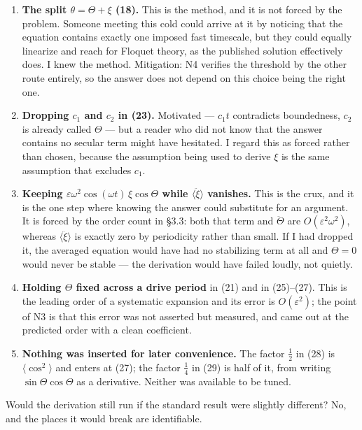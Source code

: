 \documentclass[11pt,a4paper]{article}
\providecommand{\tightlist}{\setlength{\itemsep}{0pt}\setlength{\parskip}{0pt}}
\begin{document}
\begin{enumerate}
\def\labelenumi{\arabic{enumi}.}
\tightlist
\item
  \textbf{The split \(\theta=\Theta+\xi\) (18).} This is the method, and it is not
  forced by the problem. Someone meeting this cold could arrive at it by
  noticing that the equation contains exactly one imposed fast timescale, but
  they could equally linearize and reach for Floquet theory, as the published
  solution effectively does. I knew the method. Mitigation: N4 verifies the
  threshold by the other route entirely, so the answer does not depend on this
  choice being the right one.
\item
  \textbf{Dropping \(c_1\) and \(c_2\) in (23).} Motivated --- \(c_1t\) contradicts
  boundedness, \(c_2\) is already called \(\Theta\) --- but a reader who did not know
  that the answer contains no secular term might have hesitated. I regard this
  as forced rather than chosen, because the assumption being used to derive
  \(\xi\) is the same assumption that excludes \(c_1\).
\item
  \textbf{Keeping \(\varepsilon\omega^2\cos(\omega t)\,\xi\cos\Theta\) while
  \(\langle\ddot\xi\rangle\) vanishes.} This is the crux, and it is the one step
  where knowing the answer could substitute for an argument. It is forced by
  the order count in §3.3: both that term and \(\ddot\Theta\) are
  \(O(\varepsilon^2\omega^2)\), whereas \(\langle\ddot\xi\rangle\) is exactly zero
  by periodicity rather than small. If I had dropped it, the averaged equation
  would have had no stabilizing term at all and \(\Theta=0\) would never be
  stable --- the derivation would have failed loudly, not quietly.
\item
  \textbf{Holding \(\Theta\) fixed across a drive period} in (21) and in (25)--(27).
  This is the leading order of a systematic expansion and its error is
  \(O(\varepsilon^2)\); the point of N3 is that this error was not asserted but
  measured, and came out at the predicted order with a clean coefficient.
\item
  \textbf{Nothing was inserted for later convenience.} The factor \(\tfrac12\) in (28)
  is \(\langle\cos^2\rangle\) and enters at (27); the factor \(\tfrac14\) in (29)
  is half of it, from writing \(\sin\Theta\cos\Theta\) as a derivative. Neither
  was available to be tuned.
\end{enumerate}

Would the derivation still run if the standard result were slightly
different? No, and the places it would break are identifiable.
\end{document}

